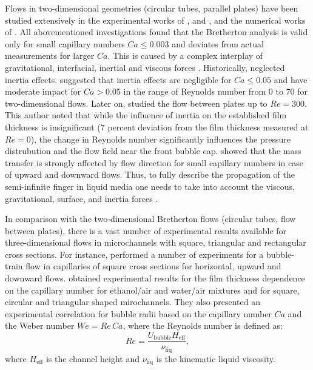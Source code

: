 \documentclass[preprint,12pt]{elsarticle}
\begin{document}
Flows in two-dimensional geometries (circular tubes, parallel plates) have been studied extensively
in the 
experimental works of \citet{aussillous-deposition}, and \citet{cerro-bubble-train}, and the
numerical works of
\citet{giavedoni-numerical,heil-bretherton}. All abovementioned investigations found that the 
Bretherton
analysis is valid only for small capillary numbers $Ca\leq 0.003$ and deviates from actual
measurements for larger $Ca$.
This is caused by a complex interplay of gravitational,
interfacial, inertial and viscous forces \cite{gupta-review}. Historically, 
\citet{bretherton} neglected inertia effects. \citet{giavedoni-numerical} suggested
that
inertia effects
are negligible for $Ca \leq 0.05$ and have moderate impact for $Ca>0.05$ in the range of Reynolds
number from $0$ to $70$ for two-dimensional flows. Later on, \citet{heil-bretherton}
studied the flow between plates up to $Re=300$. This author noted that while the
influence of inertia on the established film thickness is
insignificant
($7$ percent deviation from the film thickness measured at $Re=0$), the change in Reynolds number
significantly influences  the pressure distrubution and the flow field near the front bubble cap.
\citet{cerro-bubble-train} showed that the mass transfer is strongly affected by flow direction for
small capillary numbers in case of upward and downward flows. Thus, to fully describe the
propagation of the semi-infinite finger in liquid media one needs to take into account the
viscous, gravitational, surface, and inertia forces \cite{gupta-review}.  

In comparison with the two-dimensional Bretherton flows (circular tubes, flow between plates), there
is a vast number of experimental
results available for three-dimensional flows in microchannels with square, triangular and
rectangular cross sections. For instance, \citet{cerro-bubble-train} performed a number of
experiments for a
bubble-train flow in capillaries of square cross sections for horizontal, upward and downward flows.
\citet{shikazono-square} obtained
experimental
results for the film thickness dependence on the
capillary number for ethanol/air and water/air mixtures and for square, circular and triangular
shaped mirochannels. They also presented an experimental correlation for  bubble
radii
based on the capillary number $Ca$ and the Weber number $We=Re\,Ca$, where the Reynolds number is
defined as:
\begin{equation}
Re=\frac{U_{\mathrm{bubble}} H_{\mathrm{eff}}}{\nu_{\mathrm{liq}}},
\end{equation}
where $H_{\mathrm{eff}}$ is the channel height and $\nu_{\mathrm{liq}}$ is the kinematic liquid
viscosity.
\end{document}
